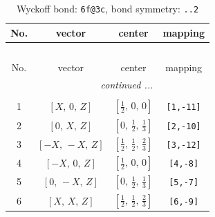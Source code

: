 \documentclass[fleqn,8pt]{jsarticle}
\begin{document}
\begin{longtable}{cccc}
\caption{Wyckoff bond: {\tt 6f@3c}, bond symmetry: {\tt ..2}}
 \\
 \hline \hline
No. & vector & center & mapping \\ \hline \endfirsthead

\multicolumn{3}{l}{\tablename\ \thetable{}} \\
 \hline \hline
No. & vector & center & mapping \\ \hline \endhead

 \hline \hline
\multicolumn{3}{r}{\footnotesize\it continued ...} \\ \endfoot

 \hline \hline
\multicolumn{3}{r}{} \\ \endlastfoot

1 & $\left[ X,\, 0,\, Z \right]$ & $\left[ \frac{1}{2},\, 0,\, 0 \right]$ & {\tt [1,-11]} \\ \hline
2 & $\left[ 0,\, X,\, Z \right]$ & $\left[ 0,\, \frac{1}{2},\, \frac{1}{3} \right]$ & {\tt [2,-10]} \\ \hline
3 & $\left[ - X,\, - X,\, Z \right]$ & $\left[ \frac{1}{2},\, \frac{1}{2},\, \frac{2}{3} \right]$ & {\tt [3,-12]} \\ \hline
4 & $\left[ - X,\, 0,\, Z \right]$ & $\left[ \frac{1}{2},\, 0,\, 0 \right]$ & {\tt [4,-8]} \\ \hline
5 & $\left[ 0,\, - X,\, Z \right]$ & $\left[ 0,\, \frac{1}{2},\, \frac{1}{3} \right]$ & {\tt [5,-7]} \\ \hline
6 & $\left[ X,\, X,\, Z \right]$ & $\left[ \frac{1}{2},\, \frac{1}{2},\, \frac{2}{3} \right]$ & {\tt [6,-9]} \\
\end{longtable}
\renewcommand{\arraystretch}{1.2}
\end{document}

